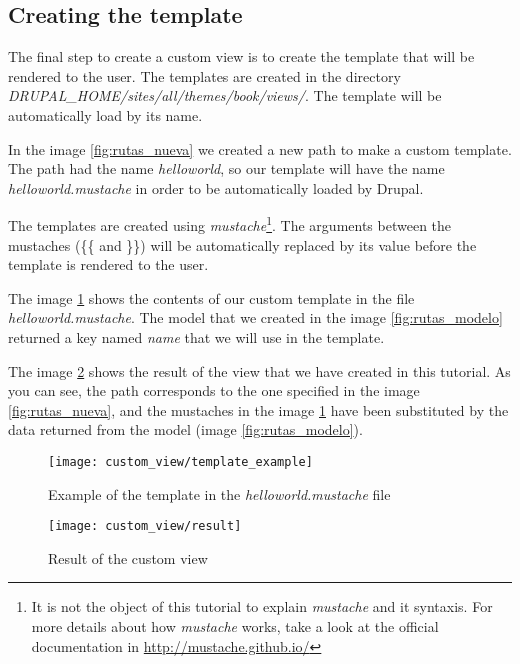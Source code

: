 \subsection{Creating the template}
	The final step to create a custom view is to create the template that will be rendered to the user.  The templates are created in the directory \textit{DRUPAL\_HOME/sites/all/themes/book/views/}.  The template will be automatically load by its name.
	
	In the image \ref{fig:rutas_nueva} we created a new path to make a custom template.  The path had the name \textit{helloworld}, so our template will have the name \textit{helloworld.mustache} in order to be automatically loaded by Drupal.  
	
	The templates are created using \textit{mustache}\footnote{It is not the object of this tutorial to explain \textit{mustache} and it syntaxis.  For more details about how \textit{mustache} works, take a look at the official documentation in \url{http://mustache.github.io/}}.  The arguments between the mustaches (\{\{ and \}\}) will be automatically replaced by its value before the template is rendered to the user.
	
	The image \ref{fig:rutas_mustache} shows the contents of our custom template in the file \textit{helloworld.mustache}.  The model that we created in the image \ref{fig:rutas_modelo} returned a key named \textit{name} that we will use in the template.
	
	The image \ref{fig:rutas_resultado} shows the result of the view that we have created in this tutorial.  As you can see, the path corresponds to the one specified in the image \ref{fig:rutas_nueva}, and the mustaches in the image \ref{fig:rutas_mustache} have been substituted by the data returned from the model (image \ref{fig:rutas_modelo}).
	\begin{figure}[h]
		\centering
		\texttt{[image: custom\_view/template\_example]}
		\caption{Example of the template in the \textit{helloworld.mustache} file}
		\label{fig:rutas_mustache}
	\end{figure}
	
	\begin{figure}[h]
		\centering
		\texttt{[image: custom\_view/result]}
		\caption{Result of the custom view}
		\label{fig:rutas_resultado}
	\end{figure}